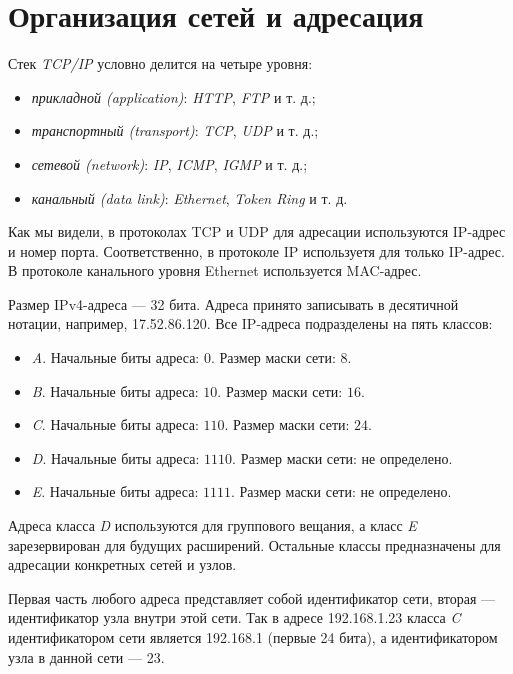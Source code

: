 \section{Организация сетей и адресация}
\label{sec:network-setup}

Стек \emph{TCP/IP} условно делится на четыре уровня:
\begin{itemize}
  \item \emph{прикладной (application)}: \emph{HTTP}, \emph{FTP} и т. д.;
  \item \emph{транспортный (transport)}: \emph{TCP}, \emph{UDP} и т. д.;
  \item \emph{сетевой (network)}: \emph{IP}, \emph{ICMP}, \emph{IGMP} и т. д.;
  \item \emph{канальный (data link)}: \emph{Ethernet}, \emph{Token Ring} и т. д.
\end{itemize}

Как мы видели, в протоколах TCP и UDP для адресации используются IP-адрес и номер порта. Соответственно, в протоколе IP используетя для только IP-адрес. В протоколе канального уровня Ethernet используется MAC-адрес.

Размер IPv4-адреса — 32 бита. Адреса принято записывать в десятичной нотации, например, 17.52.86.120. Все IP-адреса подразделены на пять классов:
\begin{itemize}
  \item \emph{A}. Начальные биты адреса: $0$. Размер маски сети: $8$.
  \item \emph{B}. Начальные биты адреса: $10$. Размер маски сети: $16$.
  \item \emph{C}. Начальные биты адреса: $110$. Размер маски сети: $24$.
  \item \emph{D}. Начальные биты адреса: $1110$. Размер маски сети: не определено.
  \item \emph{E}. Начальные биты адреса: $1111$. Размер маски сети: не определено.
\end{itemize}
Адреса класса \emph{D} используются для группового вещания, а класс \emph{E} зарезервирован для будущих расширений. Остальные классы предназначены для адресации конкретных сетей и узлов.

Первая часть любого адреса представляет собой идентификатор сети, вторая — идентификатор узла внутри этой сети. Так в адресе 192.168.1.23 класса \emph{C} идентификатором сети является 192.168.1 (первые 24 бита), а идентификатором узла в данной сети — 23.

